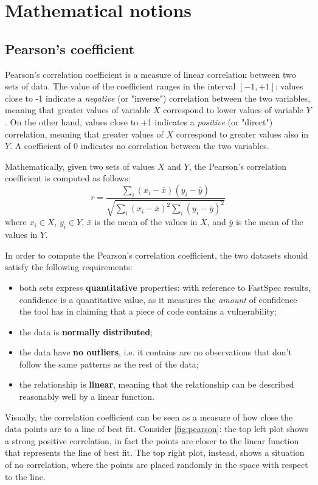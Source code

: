 \documentclass[target=mst,aauheader=aics]{thud}
\theoremstyle{definition}
\begin{document}
	\appendix
	
	\chapter{Mathematical notions}\label{appendix:maths}
	\section{Pearson's coefficient}
	Pearson's correlation coefficient \cite{Pearson1895} is a measure of linear correlation between two sets of data. The value of the coefficient ranges in the interval $[-1,+1]$: values close to -1 indicate a \textit{negative} (or "inverse") correlation between the two variables, meaning that greater values of variable $X$ correspond to lower values of variable $Y$. On the other hand, values close to +1 indicates a \textit{positive} (or "direct") correlation, meaning that greater values of $X$ correspond to greater values also in $Y$. A coefficient of 0 indicates no correlation between the two variables.	
	
	Mathematically, given two sets of values $X$ and $Y$, the Pearson's correlation coefficient is computed as follows:
	\[
		r = \frac{\sum_i(x_i-\bar{x})(y_i-\bar{y})}{\sqrt{\sum_i(x_i-\bar{x})^2\sum_i(y_i-\bar{y})^2}}
	\]
	where $x_i\in X$, $y_i\in Y$, $\bar{x}$ is the mean of the values in $X$, and $\bar{y}$ is the mean of the values in $Y$. 
	
	In order to compute the Pearson's correlation coefficient, the two datasets should satisfy the following requirements:
	\begin{itemize}
		\item both sets express \textbf{quantitative} properties: with reference to FastSpec results, confidence is a quantitative value, as it measures the \textit{amount} of confidence the tool has in claiming that a piece of code contains a vulnerability;
		\item the data is \textbf{normally distributed};
		\item the data have \textbf{no outliers}, i.e. it contains are no observations that don’t follow the same patterns as the rest of the data;
		\item the relationship is \textbf{linear}, meaning that the relationship can be described reasonably well by a linear function.
	\end{itemize}

	Visually, the correlation coefficient can be seen as a measure of how close the data points are to a line of best fit. Consider \ref{fig:pearson}: the top left plot shows a strong positive correlation, in fact the points are closer to the linear function that represents the line of best fit. The top right plot, instead, shows a situation of no correlation, where the points are placed randomly in the space with respect to the line.
\end{document}
